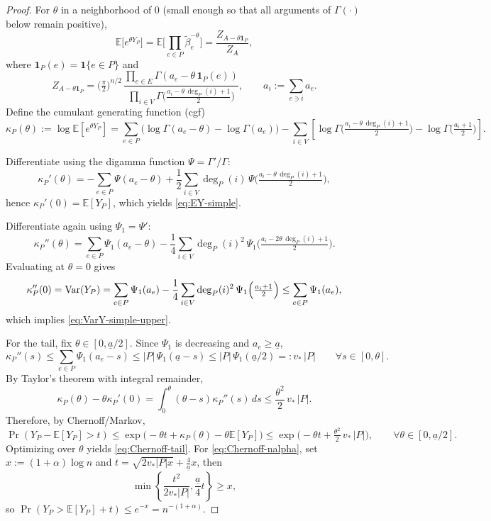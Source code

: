 \documentclass[a4paper, 11pt]{article}
\newcommand{\E}{\mathbb{E}}
\newcommand{\var}{\textnormal{Var}}
\begin{document}
\begin{proof}
For $\theta$ in a neighborhood of $0$ (small enough so that all arguments of $\Gamma(\cdot)$ below remain positive),
\[
\E\big[e^{\theta Y_P}\big]
=\E\Big[\prod_{e\in P}\tilde\beta_e^{-\theta}\Big]
=\frac{Z_{A-\theta \mathbf 1_P}}{Z_A},
\]
where $\mathbf 1_P(e)=\mathbf 1\{e\in P\}$ and
\[
Z_{A-\theta \mathbf 1_P}
=\Big(\tfrac{\pi}{2}\Big)^{n/2}\,
\frac{\prod_{e\in E}\Gamma(a_e-\theta\,\mathbf 1_P(e))}
{\prod_{i\in V}\Gamma\big(\tfrac{a_i-\theta\,\deg_P(i)+1}{2}\big)},
\qquad a_i:=\sum_{e\ni i}a_e.
\]
Define the cumulant generating function (cgf)
\[
\kappa_P(\theta):=\log \E[e^{\theta Y_P}]
=\sum_{e\in P}\big(\log\Gamma(a_e-\theta)-\log\Gamma(a_e)\big)
-\sum_{i\in V}\left[\log\Gamma\Big(\tfrac{a_i-\theta\,\deg_P(i)+1}{2}\Big)-\log\Gamma\Big(\tfrac{a_i+1}{2}\Big)\right].
\]

Differentiate using the digamma function $\Psi =\Gamma'/\Gamma$:
\[
\kappa_P'(\theta)
=-\sum_{e\in P}\Psi(a_e-\theta)
+\frac12 \sum_{i\in V}\deg_P(i)\,\Psi\Big(\tfrac{a_i-\theta\,\deg_P(i)+1}{2}\Big),
\]
hence $\kappa_P'(0)=\E[Y_P]$, which yields \eqref{eq:EY-simple}.

Differentiate again using $\Psi_1=\Psi'$:
\[
\kappa_P''(\theta)
=\sum_{e\in P}\Psi_1(a_e-\theta)
-\frac14\sum_{i\in V}\deg_P(i)^2\,\Psi_1\Big(\tfrac{a_i-2\theta\,\deg_P(i)+1}{2}\Big).
\]
Evaluating at $\theta=0$ gives
\[
\kappa_P''(0)=\var(Y_P)
=\sum_{e\in P}\Psi_1(a_e)
-\frac14\sum_{i\in V}\deg_P(i)^2\,\Psi_1\Big(\tfrac{a_i+1}{2}\Big)
\le \sum_{e\in P}\Psi_1(a_e),
\]
which implies \eqref{eq:VarY-simple-upper}.

For the tail, fix $\theta\in[0,\underline{a}/2]$. Since $\Psi_1$ is decreasing and $a_e\ge \underline{a}$,
\[
\kappa_P''(s)\le \sum_{e\in P}\Psi_1(a_e-s)\le |P|\,\Psi_1(\underline{a}-s)\le |P|\,\Psi_1(\underline{a}/2)=:v_*\,|P|
\qquad\forall s\in[0,\theta].
\]
By Taylor’s theorem with integral remainder,
\[
\kappa_P(\theta)-\theta\kappa_P'(0)
=\int_0^\theta (\theta-s)\kappa_P''(s)\,ds
\le \frac{\theta^2}{2}\,v_*\,|P|.
\]
Therefore, by Chernoff/Markov,
\[
\Pr(Y_P-\E[Y_P]>t)
\le \exp\!\Big(-\theta t+\kappa_P(\theta)-\theta\E[Y_P]\Big)
\le \exp\!\Big(-\theta t+\tfrac{\theta^2}{2}\,v_*\,|P|\Big),
\qquad \forall \theta\in[0,\underline{a}/2].
\]
Optimizing over $\theta$ yields \eqref{eq:Chernoff-tail}. For \eqref{eq:Chernoff-nalpha},
set $x:=(1+\alpha)\log n$ and $t=\sqrt{2v_*|P|x}+\frac{4}{\underline{a}}x$, then
\[
\min\left\{\frac{t^2}{2v_*|P|},\frac{\underline{a}}{4}t\right\}\ge x,
\]
so $\Pr(Y_P>\E[Y_P]+t)\le e^{-x}=n^{-(1+\alpha)}$.
\end{proof}
\end{document}
